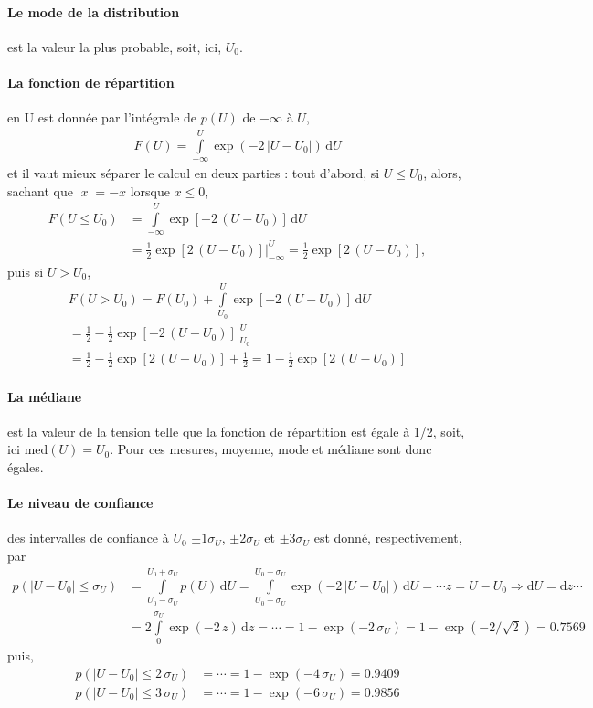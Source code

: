 \paragraph{Le mode de la distribution} est la valeur la plus probable, soit, ici, $U_0$.

\paragraph{La fonction de répartition} en U est donnée par l'intégrale de $p(U)$ de $-\infty$ à $U$,
\begin{align*}
F(U)=\int\limits_{-\infty}^{U}\exp{(-2\,|U-U_0|)}\,\text{d}U
\end{align*}
et il vaut mieux séparer le calcul en deux parties : tout d'abord, si $U\le U_0$, alors, sachant que $|x|=-x$ lorsque $x\le 0$,
\begin{align*}
F(U\le U_0)&=\int\limits_{-\infty}^{U}\exp{[+2\,(U-U_0)]}\,\text{d}U\\
&=\frac{1}{2}
\exp{[2\,(U-U_0)]}\bigg|_{-\infty}^{U}=\frac{1}{2}\exp{[2\,(U-U_0)]},
\end{align*}
puis si $U>U_0$,
\begin{multline*}
F(U>U_0)=F(U_0)+\int\limits_{U_0}^{U}\exp{[-2\,(U-U_0)]}\,\text{d}U\\=\frac{1}{2}-\frac{1}{2}
\exp{[-2\,(U-U_0)]}\bigg|_{U_0}^{U}\\
=\frac{1}{2}-\frac{1}{2}\exp{[2\,(U-U_0)]}+\frac{1}{2}=1-\frac{1}{2}\exp{[2\,(U-U_0)]}
\end{multline*}

\paragraph{La médiane} est la valeur de la tension telle que la fonction de répartition est égale à 1/2, soit, ici $\text{med}(U)=U_0$. Pour ces mesures, moyenne, mode et médiane sont donc égales.

\paragraph{Le niveau de confiance} des intervalles de confiance à $U_0$ $\pm1\sigma_U$, $\pm2\sigma_U$ et $\pm3\sigma_U$ est donné, respectivement, par
\begin{align*}
p(|U-U_0|\le \sigma_U)&=\int\limits_{U_0-\sigma_U}^{U_0+\sigma_U}p(U)\,\text{d}U=
\int\limits_{U_0-\sigma_U}^{U_0+\sigma_U}\exp{(-2\,|U-U_0|)}\,\text{d}U=\cdots z=U-U_0\Rightarrow\text{d}U=\text{d}z\cdots\\
&=2\int\limits_{0}^{\sigma_U}\exp{(-2\,z)}\,\text{d}z=\cdots=1-\exp{(-2\,\sigma_U)}=
1-\exp{(-2/\sqrt{2})}=0.7569
\end{align*}
puis,
\begin{align*}
p(|U-U_0|\le 2\,\sigma_U)&=\cdots=1-\exp{(-4\,\sigma_U)}=0.9409\\
p(|U-U_0|\le 3\,\sigma_U)&=\cdots=1-\exp{(-6\,\sigma_U)}=0.9856
\end{align*}

